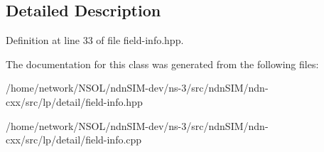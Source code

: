 \subsection{Detailed Description}


Definition at line 33 of file field-\/info.\+hpp.



The documentation for this class was generated from the following files\+:\begin{DoxyCompactItemize}
\item 
/home/network/\+N\+S\+O\+L/ndn\+S\+I\+M-\/dev/ns-\/3/src/ndn\+S\+I\+M/ndn-\/cxx/src/lp/detail/field-\/info.\+hpp\item 
/home/network/\+N\+S\+O\+L/ndn\+S\+I\+M-\/dev/ns-\/3/src/ndn\+S\+I\+M/ndn-\/cxx/src/lp/detail/field-\/info.\+cpp\end{DoxyCompactItemize}
